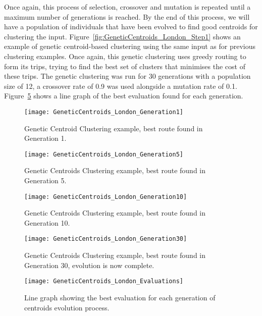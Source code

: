 \noindent
Once again, this process of selection, crossover and mutation is repeated until a maximum number of generations is reached.
By the end of this process, we will have a population of individuals that have been evolved to find good centroids
for clustering the input.
Figure~\ref{fig:GeneticCentroids_London_Step1} shows an example of genetic centroid-based clustering using the same
input as for previous clustering examples.
Once again, this genetic clustering uses greedy routing to form its trips, trying to find the best set of clusters
that minimises the cost of these trips.
The genetic clustering was run for 30 generations with a population size of 12, a crossover rate of 0.9 was used
alongside a mutation rate of 0.1.
Figure~\ref{fig:GeneticCentroids_London_Evaluations} shows a line graph of the best evaluation found for each
generation.
\begin{figure}[H]
    \ContinuedFloat*
    \centering
    \texttt{[image: GeneticCentroids\_London\_Generation1]}
    \caption{Genetic Centroid Clustering example, best route found in Generation 1.}
    \label{fig:GeneticCentroids_London_Generation1}
\end{figure}
\begin{figure}[H]
    \ContinuedFloat
    \centering
    \texttt{[image: GeneticCentroids\_London\_Generation5]}
    \caption{Genetic Centroids Clustering example, best route found in Generation 5.}
    \label{fig:GeneticCentroids_London_Generation5}
\end{figure}
\begin{figure}[H]
    \ContinuedFloat
    \centering
    \texttt{[image: GeneticCentroids\_London\_Generation10]}
    \caption{Genetic Centroids Clustering example, best route found in Generation 10.}
    \label{fig:GeneticCentroids_London_Generation10}
\end{figure}
\begin{figure}[H]
    \ContinuedFloat
    \centering
    \texttt{[image: GeneticCentroids\_London\_Generation30]}
    \caption{Genetic Centroids Clustering example, best route found in Generation 30, evolution is now complete.}
    \label{fig:GeneticCentroids_London_Generation30}
\end{figure}
\begin{figure}[H]
    \ContinuedFloat
    \centering
    \texttt{[image: GeneticCentroids\_London\_Evaluations]}
    \caption{Line graph showing the best evaluation for each generation of centroids evolution process.}
    \label{fig:GeneticCentroids_London_Evaluations}
\end{figure}
\noindent

